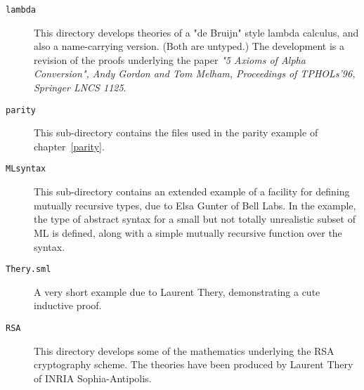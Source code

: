 \begin{description}
\item[\tt lambda]

This directory develops theories of a "de Bruijn" style lambda calculus,
and also a name-carrying version. (Both are untyped.) The development
is a revision of the proofs underlying the paper
{\it "5 Axioms of Alpha Conversion",
            Andy Gordon and Tom Melham,
            Proceedings of TPHOLs'96, Springer LNCS 1125}.

\item[\tt parity]

  This sub-directory contains the files used in the parity example of
  chapter~\ref{parity}.

\item [\tt MLsyntax]

  This sub-directory contains an extended example of a facility for
  defining mutually recursive types, due to Elsa Gunter of Bell Labs.
  In the example, the type of abstract syntax for a small but not
  totally unrealistic subset of ML is defined, along with a simple
  mutually recursive function over the syntax.

\item[\tt Thery.sml]

  A very short example due to Laurent Thery, demonstrating a cute
  inductive proof.

\item[\tt RSA]

       This directory develops some of the mathematics underlying
       the RSA cryptography scheme. The theories have been 
       produced by Laurent Thery of INRIA Sophia-Antipolis.

\end{description}


